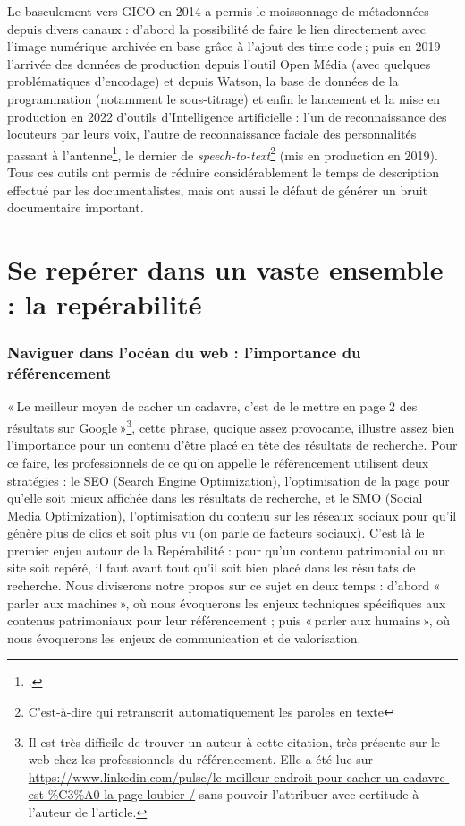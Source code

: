 Le basculement vers GICO en 2014 a permis le moissonnage de métadonnées depuis divers canaux : d’abord la possibilité de faire le lien directement avec l’image numérique archivée en base grâce à l’ajout des time code ; puis en 2019 l’arrivée des données de production depuis l’outil Open Média (avec quelques problématiques d’encodage) et depuis Watson, la base de données de la programmation (notamment le sous-titrage) et enfin le lancement et la mise en production en 2022 d’outils d’Intelligence artificielle : l’un de reconnaissance des locuteurs par leurs voix, l’autre de reconnaissance faciale des personnalités passant à l’antenne\footcite{sonderegger2024}, le dernier de \textit{speech-to-text}\footnote{C'est-à-dire qui retranscrit automatiquement les paroles en texte} (mis en production en 2019). Tous ces outils ont permis de réduire considérablement le temps de description effectué par les documentalistes, mais ont aussi le défaut de générer un bruit documentaire important.


\chapter{Se repérer dans un vaste ensemble : la repérabilité}

\subsection{Naviguer dans l'océan du web : l'importance du référencement}

« Le meilleur moyen de cacher un cadavre, c’est de le mettre en page 2 des résultats sur Google »\footnote{Il est très difficile de trouver un auteur à cette citation, très présente sur le web chez les professionnels du référencement. Elle a été lue sur \url{https://www.linkedin.com/pulse/le-meilleur-endroit-pour-cacher-un-cadavre-est-\%C3\%A0-la-page-loubier-/} sans pouvoir l’attribuer avec certitude à l’auteur de l’article.}, cette phrase, quoique assez provocante, illustre assez bien l’importance pour un contenu d’être placé en tête des résultats de recherche. Pour ce faire, les professionnels de ce qu’on appelle le référencement utilisent deux stratégies : le SEO (Search Engine Optimization), l'optimisation de la page pour qu’elle soit mieux affichée dans les résultats de recherche, et le SMO (Social Media Optimization), l'optimisation du contenu sur les réseaux sociaux pour qu’il génère plus de clics et soit plus vu (on parle de facteurs sociaux). C’est là le premier enjeu autour de la Repérabilité : pour qu’un contenu patrimonial ou un site soit repéré, il faut avant tout qu’il soit bien placé dans les résultats de recherche. Nous diviserons notre propos sur ce sujet en deux temps : d’abord « parler aux machines », où nous évoquerons les enjeux techniques spécifiques aux contenus patrimoniaux pour leur référencement ; puis « parler aux humains », où nous évoquerons les enjeux de communication et de valorisation. 

